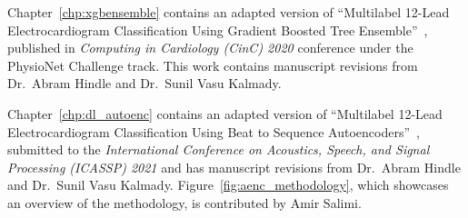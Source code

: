 \documentclass[\main/thesis.tex]{subfiles}
\begin{document}
\begin{preface}

Chapter~\ref{chp:xgbensemble} contains an adapted version of
``Multilabel 12-Lead Electrocardiogram Classification Using Gradient Boosted Tree Ensemble''~\cite{wong2020CINC-multilabel-ECG},
published in \emph{Computing in Cardiology (CinC) 2020} conference under the PhysioNet Challenge track.
This work contains manuscript revisions from Dr.\ Abram Hindle and Dr.\ Sunil Vasu Kalmady.

Chapter~\ref{chp:dl_autoenc} contains an adapted version of ``Multilabel 12-Lead Electrocardiogram Classification Using Beat to Sequence Autoencoders''~\cite{wong2021ICASSP-multilabel-ECG}, submitted to the \emph{International Conference on Acoustics, Speech, and Signal Processing (ICASSP) 2021} and has manuscript revisions from Dr.\ Abram Hindle and Dr.\ Sunil Vasu Kalmady.
Figure~\ref{fig:aenc_methodology}, which showcases an overview of the methodology, is contributed by Amir Salimi.

\end{preface}
\end{document}
